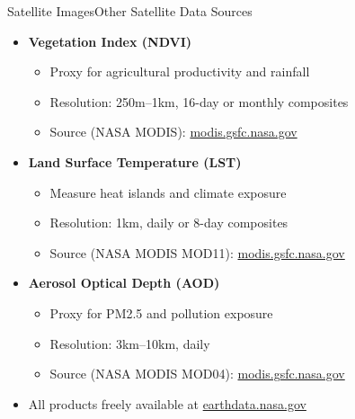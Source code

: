 \documentclass[hyperref={pdfpagelabels=false}]{beamer}
\begin{document}
\begin{frame}{Satellite Images}{Other Satellite Data Sources}
\begin{itemize}
    \item \textbf{Vegetation Index (NDVI)}
    \begin{itemize}
        \vspace{0.1cm}
        \item Proxy for agricultural productivity and rainfall
        \item Resolution: 250m--1km, 16-day or monthly composites
        \item Source (NASA MODIS): 
        \href{https://modis.gsfc.nasa.gov/data/dataprod/mod13.php}{modis.gsfc.nasa.gov}
    \end{itemize}
    \vspace{0.2cm}
    \item \textbf{Land Surface Temperature (LST)}
    \begin{itemize}
        \vspace{0.1cm}
        \item Measure heat islands and climate exposure
        \item Resolution: 1km, daily or 8-day composites
        \item Source (NASA MODIS MOD11): 
        \href{https://modis.gsfc.nasa.gov/data/dataprod/}{modis.gsfc.nasa.gov}
    \end{itemize}
    \vspace{0.2cm}
    \item \textbf{Aerosol Optical Depth (AOD)}
    \begin{itemize}
        \vspace{0.1cm}
        \item Proxy for PM2.5 and pollution exposure
        \item Resolution: 3km--10km, daily
        \item Source (NASA MODIS MOD04): 
        \href{https://modis.gsfc.nasa.gov/data/dataprod/}{modis.gsfc.nasa.gov}
    \end{itemize}
    \vspace{0.15cm}
    \item All products freely available at 
    \href{https://earthdata.nasa.gov}{earthdata.nasa.gov}
\end{itemize}
\end{frame}
\end{document}
